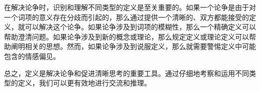 在解决论争时，识别和理解不同类型的定义是至关重要的。如果一个论争是由于对一个词项的意义存在分歧而引起的，那么通过提供一个清晰的、双方都能接受的定义，就可以解决这个论争。如果论争涉及到词项的模糊性，那么一个精确定义可以帮助澄清问题。如果论争涉及到新的概念或理论，那么规定定义或理论定义可以帮助阐明相关的思想。然而，如果论争涉及到说服定义，那么就需要警惕定义中可能包含的情感偏见。

总之，定义是解决论争和促进清晰思考的重要工具。通过仔细地考察和运用不同类型的定义，我们可以更有效地进行交流和推理。


